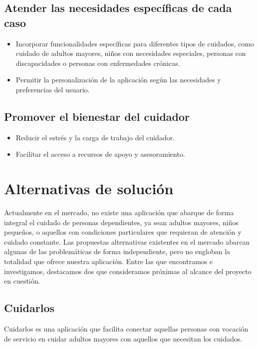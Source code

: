 \documentclass[a4paper,12pt]{article}
\begin{document}
    \subsection{Atender las necesidades específicas de cada caso}
    \begin{itemize}
        \item Incorporar funcionalidades específicas para diferentes tipos de cuidados, como cuidado de adultos mayores, niños con necesidades especiales, personas con discapacidades o personas con enfermedades crónicas.
        \item Permitir la personalización de la aplicación según las necesidades y preferencias del usuario.
    \end{itemize}
    \subsection{Promover el bienestar del cuidador}
    \begin{itemize}
        \item Reducir el estrés y la carga de trabajo del cuidador.
        \item Facilitar el acceso a recursos de apoyo y asesoramiento.
    \end{itemize}

    \section{Alternativas de solución}
    Actualmente en el mercado, no existe una aplicación que abarque de forma integral el cuidado de personas dependientes, ya sean adultos mayores, niños pequeños, o aquellos con condiciones particulares que requieran de atención y cuidado constante.\newline
    Las propuestas alternativas existentes en el mercado abarcan algunas de las problemáticas de forma independiente, pero no engloban la totalidad que ofrece nuestra aplicación.\newline
    Entre las que encontramos e investigamos, destacamos dos que consideramos próximas al alcance del proyecto en cuestión.
    \subsection{Cuidarlos}
    Cuidarlos es una aplicación que facilita conectar aquellas personas con vocación de servicio en cuidar adultos mayores con aquellos que necesitan los cuidados.
\end{document}
